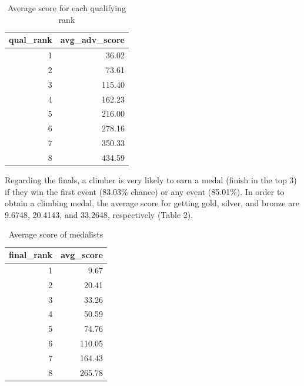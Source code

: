 \documentclass[12pt]{article}
\begin{document}
\begin{table}[ht]
\centering
\caption{Average score for each qualifying rank} 
\begin{tabular}{rr}
  \hline
qual\_rank & avg\_adv\_score \\ 
  \hline
  1 & 36.02 \\ 
    2 & 73.61 \\ 
    3 & 115.40 \\ 
    4 & 162.23 \\ 
    5 & 216.00 \\ 
    6 & 278.16 \\ 
    7 & 350.33 \\ 
    8 & 434.59 \\ 
   \hline
\end{tabular}
\end{table}

Regarding the finals, a climber is very likely to earn a medal (finish
in the top 3) if they win the first event (83.03\% chance) or any event
(85.01\%). In order to obtain a climbing medal, the average score for
getting gold, silver, and bronze are 9.6748, 20.4143, and 33.2648,
respectively (Table 2).

\begin{table}[ht]
\centering
\caption{Average score of medalists} 
\begin{tabular}{rr}
  \hline
final\_rank & avg\_score \\ 
  \hline
  1 & 9.67 \\ 
    2 & 20.41 \\ 
    3 & 33.26 \\ 
    4 & 50.59 \\ 
    5 & 74.76 \\ 
    6 & 110.05 \\ 
    7 & 164.43 \\ 
    8 & 265.78 \\ 
   \hline
\end{tabular}
\end{table}
\end{document}
